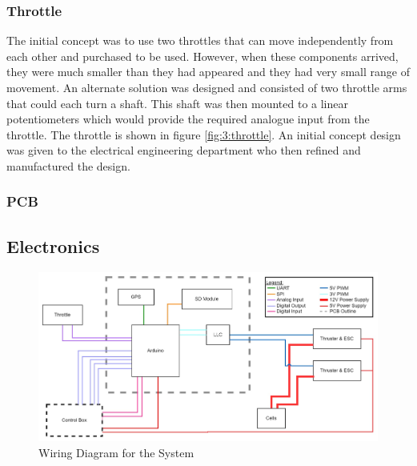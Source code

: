 		\subsubsection{Throttle}
		The initial concept was to use two throttles that can move independently from each other and %
		purchased to be used. However, when these components arrived, they were much smaller than they had appeared and they had very small range of movement. An alternate solution was designed and consisted of two throttle arms that could each turn a shaft. This shaft was then mounted to a linear potentiometers which would provide the required analogue input from the throttle. The throttle is shown in figure \ref{fig:3:throttle}. An initial concept design was given to the electrical engineering department who then refined and manufactured the design. 
		\par
		\subsubsection{PCB}
		
	\subsection{Electronics}\par
		\begin{figure}[!ht]
			\begin{center}
				\includegraphics[width = 0.95\linewidth]{figures/Wiring diagram.jpg}
				\caption{Wiring Diagram for the System}
				\label{fig:3:wiring}
			\end{center}
		\end{figure}
